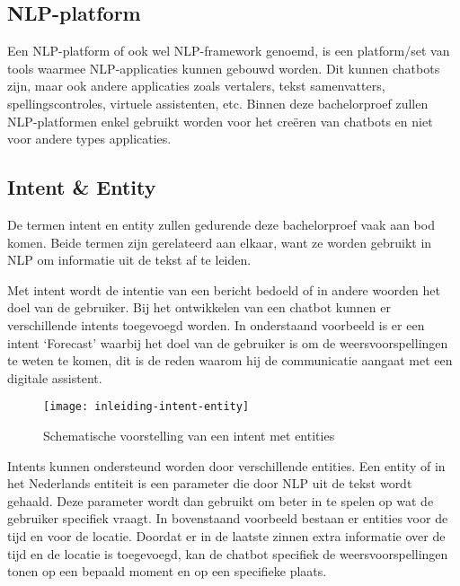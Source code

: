 \subsection{NLP-platform}
\label{subsec:begrippen-nlp-platform}

Een NLP-platform of ook wel NLP-framework genoemd, is een platform/set van tools waarmee NLP-applicaties kunnen gebouwd worden. Dit kunnen chatbots zijn, maar ook andere applicaties zoals vertalers, tekst samenvatters, spellingscontroles, virtuele assistenten, etc. Binnen deze bachelorproef zullen NLP-platformen enkel gebruikt worden voor het creëren van chatbots en niet voor andere types applicaties.

\subsection{Intent \& Entity}
\label{subsec:begrippen-intent-entity}

De termen intent en entity zullen gedurende deze bachelorproef vaak aan bod komen. Beide termen zijn gerelateerd aan elkaar, want ze worden gebruikt in NLP om informatie uit de tekst af te leiden.

Met intent wordt de intentie van een bericht bedoeld of in andere woorden het doel van de gebruiker. Bij het ontwikkelen van een chatbot kunnen er verschillende intents toegevoegd worden. In onderstaand voorbeeld is er een intent ‘Forecast’ waarbij het doel van de gebruiker is om de weersvoorspellingen te weten te komen, dit is de reden waarom hij de communicatie aangaat met een digitale assistent.

\begin{figure}[H]
    \label{fig:inleiding-intent-entity}
    \centering
    \texttt{[image: inleiding-intent-entity]}
    \caption{Schematische voorstelling van een intent met entities \autocite{GoogleCloud2020}}
\end{figure}

Intents kunnen ondersteund worden door verschillende entities. Een entity of in het Nederlands entiteit is een parameter die door NLP uit de tekst wordt gehaald. Deze parameter wordt dan gebruikt om beter in te spelen op wat de gebruiker specifiek vraagt. In bovenstaand voorbeeld bestaan er entities voor de tijd en voor de locatie. Doordat er in de laatste zinnen extra informatie over de tijd en de locatie is toegevoegd, kan de chatbot specifiek de weersvoorspellingen tonen op een bepaald moment en op een specifieke plaats.


